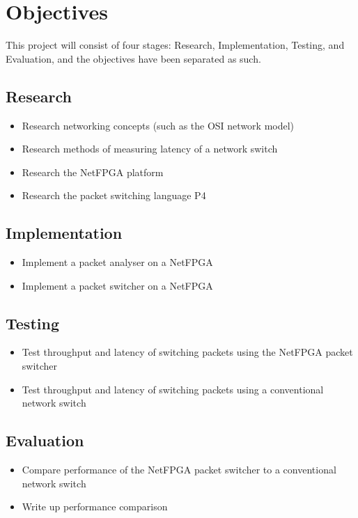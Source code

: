 \documentclass[12pt, a4paper, twoside, onecolumn]{article}
\begin{document}
\section{Objectives}
\label{objectives}
This project will consist of four stages: Research, Implementation, Testing, and Evaluation, and the objectives have been separated as such.

\subsection{Research}
\begin{itemize}
  \item Research networking concepts (such as the OSI network model)
  \item Research methods of measuring latency of a network switch
  \item Research the NetFPGA platform \cite{NetFPGA}
  \item Research the packet switching language P4 \cite{P4}
\end{itemize}
\subsection{Implementation}
\begin{itemize}
  \item Implement a packet analyser on a NetFPGA
  \item Implement a packet switcher on a NetFPGA
\end{itemize}
\subsection{Testing}
\begin{itemize}
  \item Test throughput and latency of switching packets using the NetFPGA packet switcher
  \item Test throughput and latency of switching packets using a conventional network switch
\end{itemize}
\subsection{Evaluation}
\begin{itemize}
  \item Compare performance of the NetFPGA packet switcher to a conventional network switch
  \item Write up performance comparison
\end{itemize}
\end{document}
